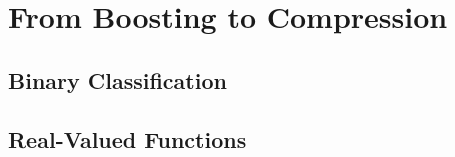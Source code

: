 
\chapter{From Boosting to Compression}
    
\blindtext
    
    


\section{Binary Classification}

\blindmathpaper

    


    
\section{Real-Valued Functions}


\blindmathpaper

    


